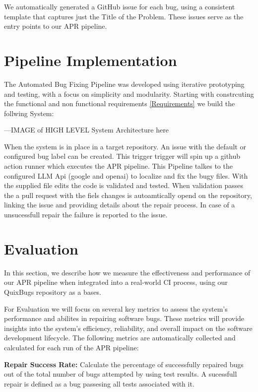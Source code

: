 We automatically generated a GitHub issue for each bug, using a consistent template that captures just the Title of the Problem. These issues serve as the entry points to our APR pipeline.


\section{Pipeline Implementation}
The Automated Bug Fixing Pipeline was developed using iterative prototyping and testing, with a focus on simplicity and modularity. Starting with constrcuting the functional and non functional requirements \ref{Requirements} we build the follwing System:

---IMAGE of HIGH LEVEL System Architecture here

When the system is in place in a target repository. An issue with the default or configured bug label can be created. This trigger trigger will spin up a github action runner which executes the APR pipeline. This Pipeline talkes to the configured LLM Api (google and openai) to localize and fix the bugy files. With the supplied file edits the code is validated and tested. When validation passes the a pull request with the fiels changes is autoamtically opend on the repository, linking the issue and providing details about the repair process. In case of a unsucessfull repair the failure is reported to the issue.


\section{Evaluation}

In this section, we describe how we measure the effectiveness and performance of our APR pipeline when integrated into a real-world CI process, using our QuixBugs repository as a bases.

For Evaluation we will focus on several key metrics to assess the system's performance and abilites in repairing software bugs. These metrics will provide insights into the system's efficiency, reliability, and overall impact on the software development lifecycle. The following metrics are automatically collected and calculated for each run of the APR pipeline:


\textbf{Repair Success Rate:} Calculate the percentage of successfully repaired bugs out of the total number of bugs attempted by using test results.
A sucessfull repair is defined as a bug passesing all tests associated with it.


